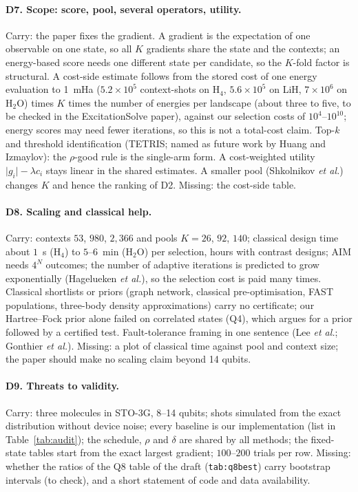 \documentclass[11pt]{article}
\newcommand{\Hfour}{H$_4$}
\newcommand{\Htwo}{H$_2$O}
\begin{document}
\paragraph{D7. Scope: score, pool, several operators, utility.} Carry: the paper fixes the gradient. A gradient is the expectation of one observable on one state, so all $K$ gradients share the state and the contexts; an energy-based score needs one different state per candidate, so the $K$-fold factor is structural. A cost-side estimate follows from the stored cost of one energy evaluation to 1~mHa ($5.2\times10^{5}$ context-shots on \Hfour{}, $5.6\times10^{5}$ on LiH, $7\times10^{6}$ on \Htwo{}) times $K$ times the number of energies per landscape (about three to five, to be checked in the ExcitationSolve paper), against our selection costs of $10^{4}$--$10^{10}$; energy scores may need fewer iterations, so this is not a total-cost claim. Top-$k$ and threshold identification (TETRIS; named as future work by Huang and Izmaylov): the $\rho$-good rule is the single-arm form. A cost-weighted utility $\lvert g_i\rvert-\lambda c_i$ stays linear in the shared estimates. A smaller pool (Shkolnikov \emph{et al.}) changes $K$ and hence the ranking of D2. Missing: the cost-side table.

\paragraph{D8. Scaling and classical help.} Carry: contexts $53$, $980$, $2{,}366$ and pools $K=26$, $92$, $140$; classical design time about $1$~s (\Hfour{}) to $5$--$6$~min (\Htwo{}) per selection, hours with contrast designs; AIM needs $4^N$ outcomes; the number of adaptive iterations is predicted to grow exponentially (Hagelueken \emph{et al.}), so the selection cost is paid many times. Classical shortlists or priors (graph network, classical pre-optimisation, FAST populations, three-body density approximations) carry no certificate; our Hartree--Fock prior alone failed on correlated states (Q4), which argues for a prior followed by a certified test. Fault-tolerance framing in one sentence (Lee \emph{et al.}; Gonthier \emph{et al.}). Missing: a plot of classical time against pool and context size; the paper should make no scaling claim beyond 14 qubits.

\paragraph{D9. Threats to validity.} Carry: three molecules in STO-3G, 8--14 qubits; shots simulated from the exact distribution without device noise; every baseline is our implementation (list in Table~\ref{tab:audit}); the schedule, $\rho$ and $\delta$ are shared by all methods; the fixed-state tables start from the exact largest gradient; $100$--$200$ trials per row. Missing: whether the ratios of the Q8 table of the draft (\texttt{tab:q8best}) carry bootstrap intervals (to check), and a short statement of code and data availability.
\end{document}
